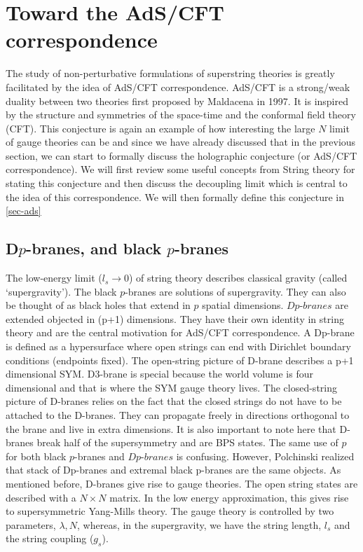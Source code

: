 \section{Toward the AdS/CFT correspondence} 
The study of non-perturbative formulations of superstring theories is greatly facilitated by the idea of AdS/CFT correspondence. AdS/CFT is 
a strong/weak duality between two theories first proposed by Maldacena in 1997. 
It is inspired by the structure and symmetries of the space-time and the conformal field theory (CFT). 
This conjecture is again an example of how interesting the large $N$ limit of gauge theories can be and since we have already discussed 
that in the previous section, we can start to formally discuss the holographic conjecture (or AdS/CFT correspondence). We will first review 
some useful concepts from String theory for stating this conjecture and then discuss the decoupling limit which is central to the idea of this 
correspondence. We will then formally define this conjecture in \ref{sec-ads} 





\subsection{D$p$-branes, and black $p$-branes} 

The low-energy limit ($l_{s} \to 0$) of string theory describes classical gravity (called `supergravity'). 
The black $p$-branes are solutions of supergravity. They can also be thought of as black holes that extend in $p$ spatial dimensions. 
$\textit{Dp-branes}$ are extended objected in (p+1) dimensions. 
They have their own identity in string theory and are the central motivation for AdS/CFT correspondence. 
A Dp-brane is defined as a hypersurface where open strings can end with Dirichlet boundary conditions (endpoints fixed). 
The open-string picture of D-brane describes a p+1 dimensional SYM. D3-brane is special because the world volume is four dimensional 
and that is where the SYM gauge theory lives. The closed-string picture of D-branes relies on the fact that the closed strings do not have to 
be attached to the D-branes. They can propagate freely in directions orthogonal to the brane and live in extra dimensions. 
It is also important to note here that D-branes break half of the supersymmetry and are BPS states. 
The same use of $p$ for both black $p$-branes and $\textit{Dp-branes}$ is confusing. 
However, Polchinski \cite{Polchinski:1995mt} realized that stack of Dp-branes and extremal black p-branes are the same objects.
As mentioned before, D-branes give rise to gauge theories. The open string states are described with a $N \times N$ matrix. 
In the low energy approximation, this gives rise to supersymmetric Yang-Mills theory. The gauge theory is controlled by two parameters, 
$\lambda, N$, whereas, in the supergravity, we have the string length, $l_{s}$ and the string coupling ($g_{s}$). 

